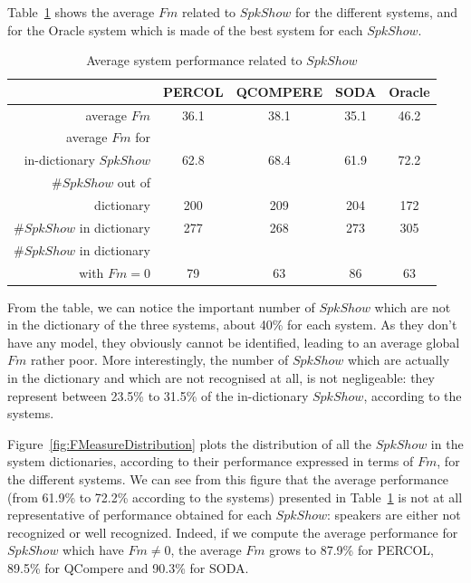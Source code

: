 

Table~\ref{table-spkshow-perf} shows the average $Fm$ related to $SpkShow$ for the different systems, and for the Oracle system which is made of the best system for each $SpkShow$.
\begin{table}[t]
\begin{center}
\footnotesize
\begin{tabular}{r||c|c|c|c}
& PERCOL & QCOMPERE & SODA & Oracle \\\hline\hline
average $Fm$ & 36.1 & 38.1 & 35.1 & 46.2\\\hline
average $Fm$ for & & & &\\
in-dictionary $SpkShow$ & 62.8 & 68.4 & 61.9 & 72.2\\\hline
\#$SpkShow$ out of & & & &\\
dictionary & 200 & 209 & 204 & 172\\\hline
\#$SpkShow$ in dictionary & 277& 268 & 273 & 305\\\hline
\#$SpkShow$ in dictionary& & & & \\
with $Fm=0$ & 79 & 63 & 86 & 63\\\hline
\end{tabular}
\caption{Average system performance related to $SpkShow$}
\label{table-spkshow-perf}
\end{center}
\end{table}

From the table, we can notice the important number of $SpkShow$ which are not in the dictionary of the three systems, about 40\% for each system. As they don't have any model, they obviously cannot be identified, leading to an average global $Fm$ rather poor. More interestingly, the number of $SpkShow$ which are actually in the dictionary and which are not recognised at all, is not negligeable: they represent between 23.5\% to 31.5\% of the in-dictionary $SpkShow$, according to the systems.


Figure~\ref{fig:FMeasureDistribution} plots the distribution of all the $SpkShow$ in the system dictionaries, according to their performance expressed in terms of $Fm$, for the different systems. We can see from this figure that the average performance (from 61.9\% to 72.2\% according to the systems) presented in Table~\ref{table-spkshow-perf} is not at all representative of performance obtained for each $SpkShow$: speakers are either not recognized or well recognized. Indeed, if we compute the average performance for $SpkShow$ which have $Fm \neq 0$, the average $Fm$ grows to 87.9\% for PERCOL, 89.5\% for QCompere and 90.3\% for SODA. 

